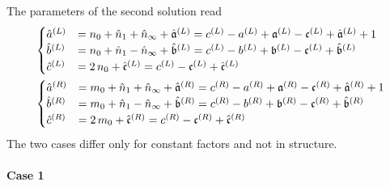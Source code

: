 The parameters of the second solution read
\begin{equation}
  \begin{split}
    &
    \begin{cases}
      \hat{a}^{(L)}
      & =
      n_{0} + \hat{n}_{1} + \hat{n}_{\infty} + \hat{\mathfrak{a}}^{(L)}
      =
      c^{(L)} - a^{(L)} + \mathfrak{a}^{(L)} - \mathfrak{c}^{(L)} + \hat{\mathfrak{a}}^{(L)} + 1
      \\
      \hat{b}^{(L)}
      & =
      n_{0} + \hat{n}_{1} - \hat{n}_{\infty} + \hat{\mathfrak{b}}^{(L)}
      =
      c^{(L)} - b^{(L)} + \mathfrak{b}^{(L)} - \mathfrak{c}^{(L)} + \hat{\mathfrak{b}}^{(L)}
      \\
      \hat{c}^{(L)}
      & =
      2\, n_{0} + \hat{\mathfrak{c}}^{(L)}
      =
      c^{(L)} - \mathfrak{c}^{(L)} + \hat{\mathfrak{c}}^{(L)}
    \end{cases}
    \\
    &
    \begin{cases}
      \hat{a}^{(R)}
      & =
      m_{0} + \hat{n}_{1} + \hat{n}_{\infty} + \hat{\mathfrak{a}}^{(R)}
      =
      c^{(R)} - a^{(R)} + \mathfrak{a}^{(R)} - \mathfrak{c}^{(R)} + \hat{\mathfrak{a}}^{(R)} + 1
      \\
      \hat{b}^{(R)}
      & =
      m_{0} + \hat{n}_{1} - \hat{n}_{\infty} + \hat{\mathfrak{b}}^{(R)}
      =
      c^{(R)} - b^{(R)} + \mathfrak{b}^{(R)} - \mathfrak{c}^{(R)} + \hat{\mathfrak{b}}^{(R)}
      \\
      \hat{c}^{(R)}
      & =
      2\, m_{0} + \hat{\mathfrak{c}}^{(R)}
      =
      c^{(R)} - \mathfrak{c}^{(R)} + \hat{\mathfrak{c}}^{(R)}
    \end{cases}
  \end{split}
\end{equation}
The two cases differ only for constant factors and not in structure.


\paragraph{Case 1}

